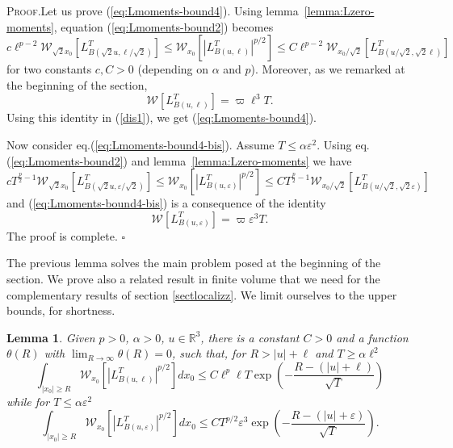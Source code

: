 \documentclass[a4paper,12pt]{article}
\newtheorem{lemma}{Lemma}
\begin{document}
\textsc{Proof.}\hspace{0.3cm}Let us prove (\ref{eq:Lmoments-bound4}). Using
lemma~\ref{lemma:Lzero-moments}, equation (\ref{eq:Lmoments-bound2}) becomes
\begin{equation}
c\ell^{p-2}\mathcal{W}_{\sqrt{2}x_{0}}[L_{B(\sqrt{2}u,\ell/\sqrt{2})}^{T}%
]\leq\mathcal{W}_{x_{0}}[|L_{B(u,\ell)}^{T}|^{p/2}]\leq C\ell^{p-2}%
\mathcal{W}_{x_{0}/\sqrt{2}}[L_{B(u/\sqrt{2},\sqrt{2}\ell)}^{T}] \label{dis1}%
\end{equation}
for two constants $c,C>0$ (depending on $\alpha$ and $p$). Moreover, as we
remarked at the beginning of the section,
\[
\mathcal{W}[L_{B(u,\ell)}^{T}]=\varpi\ell^{3}T.
\]
Using this identity in (\ref{dis1}), we get (\ref{eq:Lmoments-bound4}).

Now consider eq.(\ref{eq:Lmoments-bound4-bis}). Assume $T\leq\alpha
\varepsilon^{2}$. Using eq.(\ref{eq:Lmoments-bound2}) and
lemma~\ref{lemma:Lzero-moments} we have
\begin{equation}
cT^{\frac{p}{2}-1}\mathcal{W}_{\sqrt{2}x_{0}}[L_{B(\sqrt{2}u,\varepsilon
/\sqrt{2})}^{T}]\leq\mathcal{W}_{x_{0}}[|L_{B(u,\varepsilon)}^{T}|^{p/2}]\leq
CT^{\frac{p}{2}-1}\mathcal{W}_{x_{0}/\sqrt{2}}[L_{B(u/\sqrt{2},\sqrt
{2}\varepsilon)}^{T}] \label{dis2}%
\end{equation}
and (\ref{eq:Lmoments-bound4-bis}) is a consequence of the identity
\[
\mathcal{W}[L_{B(u,\varepsilon)}^{T}]=\varpi\varepsilon^{3}T.
\]
The proof is complete. \hfill$\square$

The previous lemma solves the main problem posed at the beginning of the
section. We prove also a related result in finite volume that we need for the
complementary results of section \ref{sectlocalizz}. We limit ourselves to the
upper bounds, for shortness.

\begin{lemma}
\label{lemmaultimo}Given $p>0$, $\alpha>0$, $u\in\mathbb{R}^{3}$, there is a
constant $C>0$ and a function $\theta\left(  R\right)  $ with $\lim
_{R\rightarrow\infty}\theta\left(  R\right)  =0$, such that, for $R>\left|
u\right|  +\ell$ and $T\geq\alpha\ell^{2}$%
\[
\int_{\left|  x_{0}\right|  \geq R}\mathcal{W}_{x_{0}}[|L_{B(u,\ell)}%
^{T}|^{p/2}]dx_{0}\leq C\ell^{p}\ell T\exp\left(  -\frac{R-\left(  \left|
u\right|  +\ell\right)  }{\sqrt{T}}\right)
\]
while for $T\leq\alpha\varepsilon^{2}$%
\[
\int_{\left|  x_{0}\right|  \geq R}\mathcal{W}_{x_{0}}[|L_{B(u,\varepsilon
)}^{T}|^{p/2}]dx_{0}\leq CT^{p/2}\varepsilon^{3}\exp\left(  -\frac{R-\left(
\left|  u\right|  +\varepsilon\right)  }{\sqrt{T}}\right)  .
\]
\end{lemma}
\end{document}
